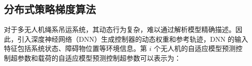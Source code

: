 \documentclass[lang=chs, degree=master, blindreview=true, winfonts=true]{yanputhesis}
\begin{document}





\subsection{分布式策略梯度算法}
对于多无人机绳系吊运系统，其动态行为复杂，难以通过解析模型精确描述。因此，引入深度神经网络（DNN）生成控制器的动态权重和参考轨迹，DNN 的输入特征包括系统状态、障碍物位置等环境信息。第 \(i\) 个无人机的自适应模型预测控制超参数和载荷的自适应模型预测控制超参数可以表示为：
\end{document}
